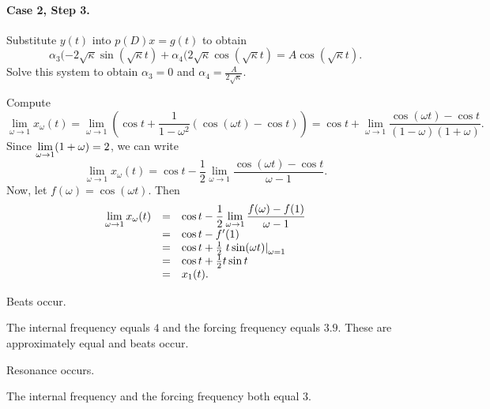 \documentclass{ximera}
\begin{document}
\paragraph{Case 2, Step 3.} Substitute $y(t)$ into $p(D)x = g(t)$ to obtain
\[
\alpha_3(-2\sqrt{\kappa}\sin(\sqrt{\kappa}t) +
\alpha_4(2\sqrt{\kappa}\cos(\sqrt{\kappa}t)
= A\cos(\sqrt{\kappa}t).
\]
Solve this system to obtain $\alpha_3 = 0$ and
$\alpha_4 = \frac{A}{2\sqrt{\kappa}}$.

Compute
\[
\lim_{\omega \rightarrow 1} x_\omega(t) =
\lim_{\omega \rightarrow 1}\left(\cos t + \frac{1}{1 - \omega^2}
(\cos(\omega t) - \cos t)\right) =
\cos t + \lim_{\omega \rightarrow 1}\frac{\cos(\omega t) - \cos t}
{(1 - \omega)(1 + \omega)}.
\]
Since $\displaystyle \lim_{\omega \rightarrow 1}(1 + \omega) = 2$, we can write
\[
\lim_{\omega \rightarrow 1} x_\omega(t) =
\cos t - \frac{1}{2}\lim_{\omega \rightarrow 1}
\frac{\cos(\omega t) - \cos t}{\omega - 1}.
\]
Now, let $f(\omega) = \cos(\omega t)$.  Then
\[
\begin{array}{rcl}
\displaystyle \lim_{\omega \rightarrow 1} x_\omega(t) & = &
\cos t - \displaystyle \frac{1}{2}\lim_{\omega \rightarrow 1}
\frac{f(\omega) - f(1)}{\omega - 1} \\
& = & \cos t - f'(1) \\
& = & \cos t + \frac{1}{2}\left.t\sin(\omega t)\right|_{\omega = 1} \\
& = & \cos t + \frac{1}{2}t\sin t \\
& = & x_1(t).
\end{array}
\]

 \ans Beats occur.

\soln  The internal frequency equals $4$ and the forcing frequency equals
$3.9$.  These are approximately equal and beats occur.

 \ans Resonance occurs.

\soln  The internal frequency and the forcing frequency both equal $3$.
\end{document}
